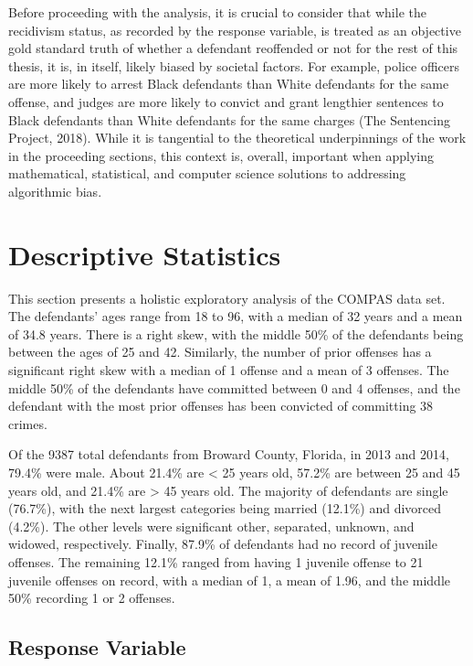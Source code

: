 \documentclass[12pt, twoside]{amherstthesis}
\begin{document}
Before proceeding with the analysis, it is crucial to consider that while the recidivism status, as recorded by the response variable, is treated as an objective gold standard truth of whether a defendant reoffended or not for the rest of this thesis, it is, in itself, likely biased by societal factors. For example, police officers are more likely to arrest Black defendants than White defendants for the same offense, and judges are more likely to convict and grant lengthier sentences to Black defendants than White defendants for the same charges (The Sentencing Project, 2018). While it is tangential to the theoretical underpinnings of the work in the proceeding sections, this context is, overall, important when applying mathematical, statistical, and computer science solutions to addressing algorithmic bias.

\hypertarget{descriptivestats}{%
\section{Descriptive Statistics}\label{descriptivestats}}

This section presents a holistic exploratory analysis of the COMPAS data set. The defendants' ages range from 18 to 96, with a median of 32 years and a mean of 34.8 years. There is a right skew, with the middle 50\% of the defendants being between the ages of 25 and 42. Similarly, the number of prior offenses has a significant right skew with a median of 1 offense and a mean of 3 offenses. The middle 50\% of the defendants have committed between 0 and 4 offenses, and the defendant with the most prior offenses has been convicted of committing 38 crimes.

Of the 9387 total defendants from Broward County, Florida, in 2013 and 2014, 79.4\% were male. About 21.4\% are \textless{} 25 years old, 57.2\% are between 25 and 45 years old, and
21.4\% are \textgreater{} 45 years old. The majority of defendants are single (76.7\%), with the next largest categories being married (12.1\%) and divorced (4.2\%). The other levels were significant other, separated, unknown, and widowed, respectively. Finally, 87.9\% of defendants had no record of juvenile offenses. The remaining 12.1\% ranged from having 1 juvenile offense to 21 juvenile offenses on record, with a median of 1, a mean of 1.96, and the middle 50\% recording 1 or 2 offenses.

\hypertarget{response}{%
\subsection{Response Variable}\label{response}}
\end{document}
